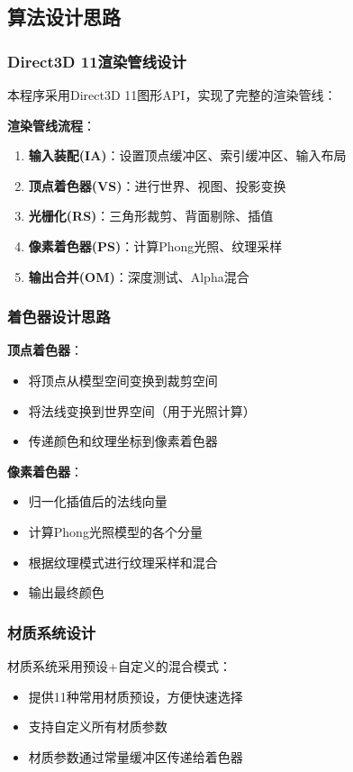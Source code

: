 \documentclass[12pt,a4paper]{article}
\begin{document}
\begin{tcolorbox}
\subsection{算法设计思路}

\subsubsection{Direct3D 11渲染管线设计}

本程序采用Direct3D 11图形API，实现了完整的渲染管线：

\textbf{渲染管线流程}：
\begin{enumerate}
    \item \textbf{输入装配(IA)}：设置顶点缓冲区、索引缓冲区、输入布局
    \item \textbf{顶点着色器(VS)}：进行世界、视图、投影变换
    \item \textbf{光栅化(RS)}：三角形裁剪、背面剔除、插值
    \item \textbf{像素着色器(PS)}：计算Phong光照、纹理采样
    \item \textbf{输出合并(OM)}：深度测试、Alpha混合
\end{enumerate}

\subsubsection{着色器设计思路}

\textbf{顶点着色器}：
\begin{itemize}
    \item 将顶点从模型空间变换到裁剪空间
    \item 将法线变换到世界空间（用于光照计算）
    \item 传递颜色和纹理坐标到像素着色器
\end{itemize}

\textbf{像素着色器}：
\begin{itemize}
    \item 归一化插值后的法线向量
    \item 计算Phong光照模型的各个分量
    \item 根据纹理模式进行纹理采样和混合
    \item 输出最终颜色
\end{itemize}

\subsubsection{材质系统设计}

材质系统采用预设+自定义的混合模式：
\begin{itemize}
    \item 提供11种常用材质预设，方便快速选择
    \item 支持自定义所有材质参数
    \item 材质参数通过常量缓冲区传递给着色器
\end{itemize}
\end{tcolorbox}
\end{document}
